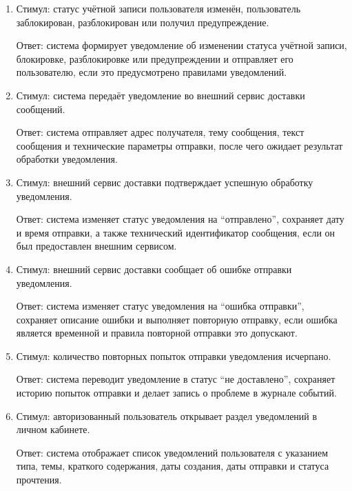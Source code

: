 \documentclass[12pt,a4paper]{article}
\begin{document}
\begin{enumerate}
		Ответ: система создаёт уведомление о статусе штрафа, указывает причину
		начисления, сумму, связанный материал и итоговый статус операции, если такие
		данные требуются шаблоном уведомления.
		
		\item Стимул: статус учётной записи пользователя изменён, пользователь заблокирован,
		разблокирован или получил предупреждение.
		
		Ответ: система формирует уведомление об изменении статуса учётной записи,
		блокировке, разблокировке или предупреждении и отправляет его пользователю,
		если это предусмотрено правилами уведомлений.
		
		\item Стимул: система передаёт уведомление во внешний сервис доставки сообщений.
		
		Ответ: система отправляет адрес получателя, тему сообщения, текст сообщения
		и технические параметры отправки, после чего ожидает результат обработки
		уведомления.
		
		\item Стимул: внешний сервис доставки подтверждает успешную обработку уведомления.
		
		Ответ: система изменяет статус уведомления на ``отправлено'', сохраняет дату
		и время отправки, а также технический идентификатор сообщения, если он был
		предоставлен внешним сервисом.
		
		\item Стимул: внешний сервис доставки сообщает об ошибке отправки уведомления.
		
		Ответ: система изменяет статус уведомления на ``ошибка отправки'', сохраняет
		описание ошибки и выполняет повторную отправку, если ошибка является временной
		и правила повторной отправки это допускают.
		
		\item Стимул: количество повторных попыток отправки уведомления исчерпано.
		
		Ответ: система переводит уведомление в статус ``не доставлено'', сохраняет
		историю попыток отправки и делает запись о проблеме в журнале событий.
		
		\item Стимул: авторизованный пользователь открывает раздел уведомлений
		в личном кабинете.
		
		Ответ: система отображает список уведомлений пользователя с указанием типа,
		темы, краткого содержания, даты создания, даты отправки и статуса прочтения.
		

\end{enumerate}
\end{document}
